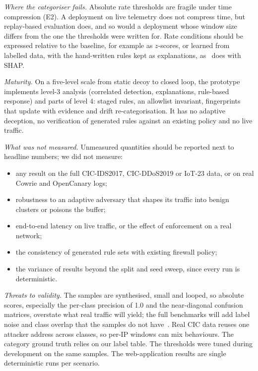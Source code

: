 \documentclass[conference]{IEEEtran}
\begin{document}
\textit{Where the categoriser fails.} Absolute rate thresholds are fragile under time compression (E2). A deployment on live telemetry does not compress time, but replay-based evaluation does, and so would a deployment whose window size differs from the one the thresholds were written for. Rate conditions should be expressed relative to the baseline, for example as $z$-scores, or learned from labelled data, with the hand-written rules kept as explanations, as~\cite{beltran2026} does with SHAP.

\textit{Maturity.} On a five-level scale from static decoy to closed loop, the prototype implements level-3 analysis (correlated detection, explanations, rule-based response) and parts of level 4: staged rules, an allowlist invariant, fingerprints that update with evidence and drift re-categorisation. It has no adaptive deception, no verification of generated rules against an existing policy and no live traffic.

\textit{What was not measured.} Unmeasured quantities should be reported next to headline numbers; we did not measure:
\begin{itemize}
\item any result on the full CIC-IDS2017, CIC-DDoS2019 or IoT-23 data, or on real Cowrie and OpenCanary logs;
\item robustness to an adaptive adversary that shapes its traffic into benign clusters or poisons the buffer;
\item end-to-end latency on live traffic, or the effect of enforcement on a real network;
\item the consistency of generated rule sets with existing firewall policy;
\item the variance of results beyond the split and seed sweep, since every run is deterministic.
\end{itemize}

\textit{Threats to validity.} The samples are synthesised, small and looped, so absolute scores, especially the per-class precision of 1.0 and the near-diagonal confusion matrices, overstate what real traffic will yield; the full benchmarks will add label noise and class overlap that the samples do not have~\cite{aparna2026,beltran2026}. Real CIC data reuses one attacker address across classes, so per-IP windows can mix behaviours. The category ground truth relies on our label table. The thresholds were tuned during development on the same samples. The web-application results are single deterministic runs per scenario.
\end{document}
